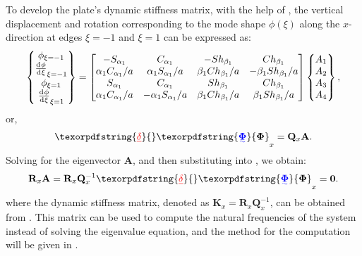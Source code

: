 \documentclass[preprint,12pt,number]{elsarticle}
\newcommand{\id}{\mathrm{d}\mkern1mu}
\providecommand{\DIFaddtex}[1]{{\protect\color{blue}\uwave{#1}}} %
\providecommand{\DIFdeltex}[1]{{\protect\color{red}\sout{#1}}}                      %
\providecommand{\DIFaddbegin}{} %
\providecommand{\DIFaddend}{} %
\providecommand{\DIFdelbegin}{} %
\providecommand{\DIFdelend}{} %
\providecommand{\DIFadd}[1]{\texorpdfstring{\DIFaddtex{#1}}{#1}} %
\providecommand{\DIFdel}[1]{\texorpdfstring{\DIFdeltex{#1}}{}} %
\newcommand{\DIFscaledelfig}{0.5}
\newlength{\DIFdelgraphicswidth} %
\newlength{\DIFdelgraphicsheight} %
\newcommand{\DIFaddincludegraphics}[2][]{{\color{blue}\fbox{\DIFOincludegraphics[#1]{#2}}}} %
\newcommand{\DIFdelincludegraphics}[2][]{%
\sbox{\DIFdelgraphicsbox}{\DIFOincludegraphics[#1]{#2}}%
\settoboxwidth{\DIFdelgraphicswidth}{\DIFdelgraphicsbox} %
\settoboxtotalheight{\DIFdelgraphicsheight}{\DIFdelgraphicsbox} %
\scalebox{\DIFscaledelfig}{%
\parbox[b]{\DIFdelgraphicswidth}{\usebox{\DIFdelgraphicsbox}\\[-\baselineskip] \rule{\DIFdelgraphicswidth}{0em}}\llap{\resizebox{\DIFdelgraphicswidth}{\DIFdelgraphicsheight}{%
\setlength{\unitlength}{\DIFdelgraphicswidth}%
\begin{picture}(1,1)%
\thicklines\linethickness{2pt} %
{\color[rgb]{1,0,0}\put(0,0){\framebox(1,1){}}}%
{\color[rgb]{1,0,0}\put(0,0){\line( 1,1){1}}}%
{\color[rgb]{1,0,0}\put(0,1){\line(1,-1){1}}}%
\end{picture}%
}\hspace*{3pt}}} %
} %
\DeclareRobustCommand{\DIFaddbegin}{\DIFOaddbegin \let\includegraphics\DIFaddincludegraphics} %
\DeclareRobustCommand{\DIFaddend}{\DIFOaddend \let\includegraphics\DIFOincludegraphics} %
\DeclareRobustCommand{\DIFdelbegin}{\DIFOdelbegin \let\includegraphics\DIFdelincludegraphics} %
\DeclareRobustCommand{\DIFdelend}{\DIFOaddend \let\includegraphics\DIFOincludegraphics} %
\begin{document}
To develop the plate's dynamic stiffness matrix, with the help of , the vertical displacement and rotation corresponding to the mode shape $\phi(\xi)$ along the $x$-direction at edges $\xi = -1$ and $\xi = 1$ can be expressed as:
%
\begin{equation}\label{eq:UBx}
\begin{split}
	\begin{Bmatrix}
		\phi_{\xi=-1}\\\frac{\id \phi}{\id \xi}_{\xi=-1}\\\phi_{\xi=1}\\\frac{\id \phi}{\id \xi}_{\xi=1}
	\end{Bmatrix}
	= \begin{bmatrix}
		-S_{\alpha_1}&C_{\alpha_1}&-Sh_{\beta_1}&Ch_{\beta_1}\\
		\alpha_1 C_{\alpha_1}/a&\alpha_1S_{\alpha_1}/a&\beta_1Ch_{\beta_1}/a&-\beta_1Sh_{\beta_1}/a\\
		S_{\alpha_1}&C_{\alpha_1}&Sh_{\beta_1}&Ch_{\beta_1}\\
		\alpha_1 C_{\alpha_1}/a&-\alpha_1S_{\alpha_1}/a&\beta_1Ch_{\beta_1}/a&\beta_1Sh_{\beta_1}/a
	\end{bmatrix}
	\begin{Bmatrix}
		A_1\\A_2\\A_3\\A_4
	\end{Bmatrix} ,
\end{split}
\end{equation}
%
or,
%
\begin{equation}\label{eq:UBx1}
\DIFdelbegin \DIFdel{\mathbf{\delta}}\DIFdelend \DIFaddbegin \DIFadd{\mathbf{\Phi}}\DIFaddend _x= \mathbf{Q}_x\mathbf{A}.
\end{equation}
%
Solving for the eigenvector $\mathbf{A}$, and then substituting into , we obtain:
%
\begin{equation}\label{eq:DSM_eqx}
\mathbf{R}_x \mathbf{A}=\mathbf{R}_x\mathbf{Q}_x^{-1}\DIFdelbegin \DIFdel{\mathbf{\delta}}\DIFdelend \DIFaddbegin \DIFadd{\mathbf{\Phi}}\DIFaddend _x = \mathbf{0}.
\end{equation}
%
where the dynamic stiffness matrix, denoted as $\mathbf{K}_x = \mathbf{R}_x\mathbf{Q}_x^{-1}$, can be obtained from . 
This matrix can be used to compute the natural frequencies of the system instead of solving the eigenvalue equation, 
and the method for the computation will be given in .
\end{document}
